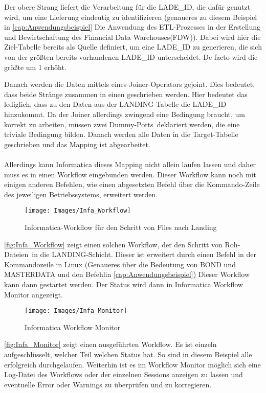 Der obere Strang liefert die Verarbeitung für die LADE\_ID, die dafür genutzt wird, um eine Lieferung eindeutig zu identifizieren (genaueres zu diesem Beispiel in \autoref{cap:Anwendungsbeispiel} \glqq Die Anwendung des ETL-Prozesses in der Erstellung und Bewirtschaftung des Financial Data Warehouses(FDW)\grqq). Dabei wird hier die Ziel-Tabelle bereits als Quelle definiert, um eine LADE\_ID zu generieren, die sich von der größten bereits vorhandenen LADE\_ID unterscheidet. De facto wird die größte um 1 erhöht. 

Danach werden die Daten mittels eines Joiner-Operators gejoint. Dies bedeutet, dass beide Stränge zusammen in einen geschrieben werden. 
Hier bedeutet das lediglich, dass zu den Daten aus der LANDING-Tabelle die LADE\_ID hinzukommt. Da der Joiner allerdings zwingend eine Bedingung braucht, um korrekt zu arbeiten, müssen zwei \glqq Dummy-Ports\grqq~deklariert werden, die eine triviale Bedingung bilden. Danach werden alle Daten in die Target-Tabelle geschrieben und das Mapping ist abgearbeitet. \\
\\
Allerdings kann Informatica dieses Mapping nicht allein laufen lassen und daher muss es in einen Workflow eingebunden werden. Dieser Workflow kann noch mit einigen anderen Befehlen, wie einen abgesetzten Befehl über die Kommando-Zeile des jeweiligen Betriebssystems, erweitert werden.
\begin{figure}[H]
	\begin{center}
		\texttt{[image: Images/Infa\_Workflow]}
		\caption{Informatica-Workflow für den Schritt von Files nach Landing \cite{Intern}}
		\label{fig:Infa_Workflow}
	\end{center}
\end{figure} 
\autoref{fig:Infa_Workflow} zeigt einen solchen Workflow, der den Schritt von \glqq Roh-Dateien\glqq~in die LANDING-Schicht. Dieser ist erweitert durch einen Befehl in der Kommandozeile in Linux (Genaueres über die Bedeutung von BOND und MASTERDATA und den Befehlin \autoref{cap:Anwendungsbeispiel}) 
Dieser Workflow kann dann gestartet werden. Der Status wird dann in Informatica Workflow Monitor angezeigt.
\begin{figure}[H]
	\begin{center}
		\texttt{[image: Images/Infa\_Monitor]}
		\caption{Informatica Workflow Monitor \cite{Intern}}
		\label{fig:Infa_Monitor}
	\end{center}
\end{figure}
\autoref{fig:Infa_Monitor} zeigt einen ausgeführten Workflow. Es ist einzeln aufgeschlüsselt, welcher Teil welchen Status hat. So sind in diesem Beispiel alle erfolgreich durchgelaufen. Weiterhin ist es im Workflow Monitor möglich sich eine Log-Datei des Workflows oder der einzelnen Sessions anzeigen zu lassen und eventuelle Error oder Warnings zu überprüfen und zu korregieren. 
\cite{ITEW:Thomas_02-08}\cite{Wikipedia:Informatica}

